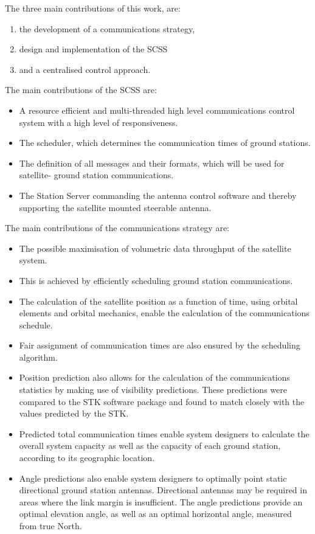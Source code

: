 The three main contributions of this work, are:
\begin{enumerate}
\item the development of a communications strategy,
\item design and implementation of the SCSS
\item and a centralised control approach.
\end{enumerate}

The main contributions of the SCSS are:
\begin{itemize}
\item A resource efficient and multi-threaded high level communications control system
with a high level of responsiveness.
\item The scheduler, which determines the communication times of ground stations.
\item The definition of all messages and their formats, which will be used for satellite-
ground station communications.
\item The Station Server commanding the antenna control software and thereby
supporting the satellite mounted steerable antenna.
\end{itemize}

The main contributions of the communications strategy are:
\begin{itemize}
\item The possible maximisation of volumetric data throughput of the satellite system.
\item This is achieved by efficiently scheduling ground station communications.
\item The calculation of the satellite position as a function of time, using orbital elements and
orbital mechanics, enable the calculation of the communications schedule.
\item Fair assignment of communication times are also ensured by the scheduling algorithm.
\item Position prediction also allows for the calculation of the communications statistics
by making use of visibility predictions. These predictions were compared to the STK
software package and found to match closely with the values predicted by the STK.
\item Predicted total communication times enable system designers to calculate the
overall system capacity as well as the capacity of each ground station, according to its geographic location.
\item Angle predictions also enable system designers to optimally point static directional ground
station antennas. Directional antennas may be required in areas where the link margin is
insufficient. The angle predictions provide an optimal elevation angle, as well as an optimal
horizontal angle, measured from true North.
\end{itemize}

